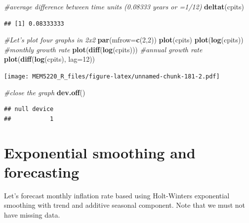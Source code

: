 \documentclass[]{book}
\newenvironment{Shaded}{\begin{snugshade}}{\end{snugshade}}
\newcommand{\CommentTok}[1]{\textcolor[rgb]{0.56,0.35,0.01}{\textit{#1}}}
\newcommand{\DataTypeTok}[1]{\textcolor[rgb]{0.13,0.29,0.53}{#1}}
\newcommand{\DecValTok}[1]{\textcolor[rgb]{0.00,0.00,0.81}{#1}}
\newcommand{\KeywordTok}[1]{\textcolor[rgb]{0.13,0.29,0.53}{\textbf{#1}}}
\newcommand{\NormalTok}[1]{#1}
\begin{document}
\begin{Shaded}
\begin{Highlighting}[]
\CommentTok{#average difference between time units (0.08333 years or =1/12)}
\KeywordTok{deltat}\NormalTok{(cpits)}
\end{Highlighting}
\end{Shaded}

\begin{verbatim}
## [1] 0.08333333
\end{verbatim}

\begin{Shaded}
\begin{Highlighting}[]
\CommentTok{#Let's plot four graphs in 2x2}
\KeywordTok{par}\NormalTok{(}\DataTypeTok{mfrow=}\KeywordTok{c}\NormalTok{(}\DecValTok{2}\NormalTok{,}\DecValTok{2}\NormalTok{))}
\KeywordTok{plot}\NormalTok{(cpits)}
\KeywordTok{plot}\NormalTok{(}\KeywordTok{log}\NormalTok{(cpits))}
\CommentTok{#monthly growth rate}
\KeywordTok{plot}\NormalTok{(}\KeywordTok{diff}\NormalTok{(}\KeywordTok{log}\NormalTok{(cpits)))}
\CommentTok{#annual growth rate}
\KeywordTok{plot}\NormalTok{(}\KeywordTok{diff}\NormalTok{(}\KeywordTok{log}\NormalTok{(cpits), }\DataTypeTok{lag=}\DecValTok{12}\NormalTok{))}
\end{Highlighting}
\end{Shaded}

\texttt{[image: MEM5220\_R\_files/figure-latex/unnamed-chunk-181-2.pdf]}

\begin{Shaded}
\begin{Highlighting}[]
\CommentTok{#close the graph}
\KeywordTok{dev.off}\NormalTok{()}
\end{Highlighting}
\end{Shaded}

\begin{verbatim}
## null device 
##           1
\end{verbatim}

\hypertarget{exponential-smoothing-and-forecasting}{%
\section{Exponential smoothing and forecasting}\label{exponential-smoothing-and-forecasting}}

Let's forecast monthly inflation rate based using Holt-Winters exponential smoothing with trend and additive seasonal component. Note that we must not have missing data.
\end{document}
